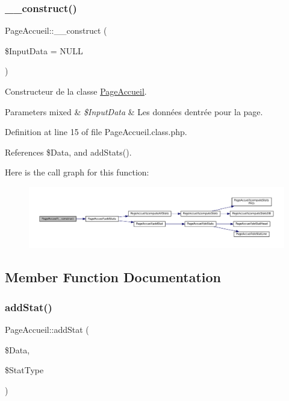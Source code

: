\subsubsection{\texorpdfstring{\+\_\+\+\_\+construct()}{\_\_construct()}}
{\footnotesize\ttfamily Page\+Accueil\+::\+\_\+\+\_\+construct (\begin{DoxyParamCaption}\item[{}]{\$\+Input\+Data = {\ttfamily NULL} }\end{DoxyParamCaption})}

Constructeur de la classe \hyperlink{class_page_accueil}{Page\+Accueil}.


\begin{DoxyParams}[1]{Parameters}
mixed & {\em \$\+Input\+Data} & Les données d\textquotesingle{}entrée pour la page. \\
\hline
\end{DoxyParams}


Definition at line 15 of file Page\+Accueil.\+class.\+php.



References \$\+Data, and add\+Stats().

Here is the call graph for this function\+:\nopagebreak
\begin{figure}[H]
\begin{center}
\leavevmode
\includegraphics[width=350pt]{class_page_accueil_a94778509e719e4a7620440be3b76f986_cgraph}
\end{center}
\end{figure}


\subsection{Member Function Documentation}
\mbox{\label{class_page_accueil_a32d82822c35bdbac485363e5f6b95418}} 
\subsubsection{\texorpdfstring{add\+Stat()}{addStat()}}
{\footnotesize\ttfamily Page\+Accueil\+::add\+Stat (\begin{DoxyParamCaption}\item[{}]{\$\+Data,  }\item[{}]{\$\+Stat\+Type }\end{DoxyParamCaption})\hspace{0.3cm}{\ttfamily [protected]}}

